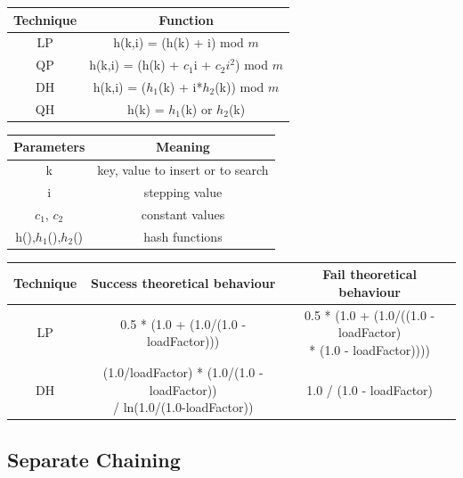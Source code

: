 \documentclass{article}
\begin{document}
\begin{center}
\begin{tabular}{c|c}
    Technique & Function\\
\hline
    LP & h(k,i) = (h(k) + i) mod $m$ \\
\hline
    QP & h(k,i) = (h(k) + $c_1$i + $c_2i^2$) mod $m$ \\
\hline
    DH & h(k,i) = ($h_1$(k) + i*$h_2$(k)) mod $m$ \\
\hline
    QH & h(k) = $h_1$(k) or $h_2$(k) \\
\end{tabular}

\begin{tabular}{c|c}
    Parameters & Meaning \\
\hline
    k & key, value to insert or to search \\
\hline
    i & stepping value \\
\hline
    $c_1$, $c_2$ & constant values \\
\hline
    h(),$h_1$(),$h_2$() & hash functions \\
\end{tabular}
\end{center}

\begin{tabular}{c|c|c}
    Technique & Success theoretical behaviour & Fail theoretical behaviour \\
\hline
    LP &  0.5 * (1.0 + (1.0/(1.0 - loadFactor))) & \makecell{0.5 * (1.0 + (1.0/((1.0 - loadFactor) \\ * (1.0 - loadFactor))))} \\
\hline
    DH & \makecell{(1.0/loadFactor) * (1.0/(1.0 - loadFactor)) \\ / ln(1.0/(1.0-loadFactor))} & 1.0 / (1.0 - loadFactor) \\
\end{tabular}

    \subsection{Separate Chaining}
    
\end{document}
